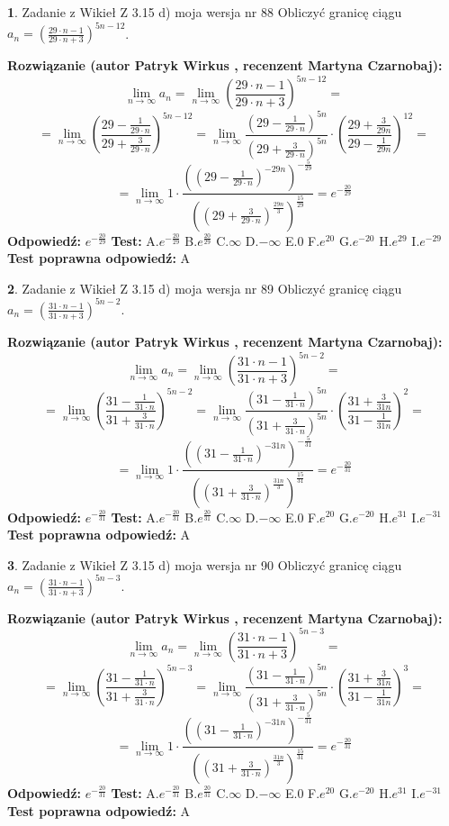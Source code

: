 \documentclass[12pt, a4paper]{article}
\theoremstyle{definition} %
\newtheorem{zad}{}
\newcommand{\zadStart}[1]{\begin{zad}#1\newline}
\newcommand{\zadStop}{\end{zad}}
\newcommand{\rozwStart}[2]{\noindent \textbf{Rozwiązanie (autor #1 , recenzent #2): }\newline}
\newcommand{\rozwStop}{\newline}
\newcommand{\odpStart}{\noindent \textbf{Odpowiedź:}\newline}
\newcommand{\odpStop}{\newline}
\newcommand{\testStart}{\noindent \textbf{Test:}\newline}
\newcommand{\testStop}{\newline}
\newcommand{\kluczStart}{\noindent \textbf{Test poprawna odpowiedź:}\newline}
\newcommand{\kluczStop}{\newline}
\begin{document}
\zadStart{Zadanie z Wikieł Z 3.15 d) moja wersja nr 88}
Obliczyć granicę ciągu $a_{n}=(\frac{29\cdot n - 1}{29 \cdot n + 3})^{5n-12}$.
\zadStop
\rozwStart{Patryk Wirkus}{Martyna Czarnobaj}
$$\lim\limits_{n\to\infty} a_{n} = \lim\limits_{n\to\infty}(\frac{29\cdot n - 1}{29 \cdot n + 3})^{5n-12}=$$
$$=\lim\limits_{n\to\infty}(\frac{29 - \frac{1}{29\cdot n}}{29 + \frac{3}{29 \cdot n}})^{5n-12}=\lim\limits_{n\to\infty}\frac{(29 - \frac{1}{29\cdot n})^{5n}}{(29 + \frac{3}{29\cdot n})^{5n}} \cdot (\frac{29+\frac{3}{29n}}{29-\frac{1}{29n}})^{12}=$$
$$=\lim\limits_{n\to\infty} 1 \cdot \frac{((29-\frac{1}{29 \cdot n})^{-29n})^{-\frac{5}{29}}}{((29+\frac{3}{29 \cdot n})^{\frac{29n}{3}})^{\frac{15}{29}}} =e^{-\frac{20}{29}}$$
\rozwStop
\odpStart
$e^{-\frac{20}{29}}$
\odpStop
\testStart
A.$ e^{-\frac{20}{29}}$
B.$ e^{\frac{20}{29}}$
C.$\infty$
D.$-\infty$
E.$0$
F.$e^{20}$
G.$e^{-20}$
H.$e^{29}$
I.$e^{-29}$
\testStop
\kluczStart
A
\kluczStop



\zadStart{Zadanie z Wikieł Z 3.15 d) moja wersja nr 89}
Obliczyć granicę ciągu $a_{n}=(\frac{31\cdot n - 1}{31 \cdot n + 3})^{5n-2}$.
\zadStop
\rozwStart{Patryk Wirkus}{Martyna Czarnobaj}
$$\lim\limits_{n\to\infty} a_{n} = \lim\limits_{n\to\infty}(\frac{31\cdot n - 1}{31 \cdot n + 3})^{5n-2}=$$
$$=\lim\limits_{n\to\infty}(\frac{31 - \frac{1}{31\cdot n}}{31 + \frac{3}{31 \cdot n}})^{5n-2}=\lim\limits_{n\to\infty}\frac{(31 - \frac{1}{31\cdot n})^{5n}}{(31 + \frac{3}{31\cdot n})^{5n}} \cdot (\frac{31+\frac{3}{31n}}{31-\frac{1}{31n}})^{2}=$$
$$=\lim\limits_{n\to\infty} 1 \cdot \frac{((31-\frac{1}{31 \cdot n})^{-31n})^{-\frac{5}{31}}}{((31+\frac{3}{31 \cdot n})^{\frac{31n}{3}})^{\frac{15}{31}}} =e^{-\frac{20}{31}}$$
\rozwStop
\odpStart
$e^{-\frac{20}{31}}$
\odpStop
\testStart
A.$ e^{-\frac{20}{31}}$
B.$ e^{\frac{20}{31}}$
C.$\infty$
D.$-\infty$
E.$0$
F.$e^{20}$
G.$e^{-20}$
H.$e^{31}$
I.$e^{-31}$
\testStop
\kluczStart
A
\kluczStop



\zadStart{Zadanie z Wikieł Z 3.15 d) moja wersja nr 90}
Obliczyć granicę ciągu $a_{n}=(\frac{31\cdot n - 1}{31 \cdot n + 3})^{5n-3}$.
\zadStop
\rozwStart{Patryk Wirkus}{Martyna Czarnobaj}
$$\lim\limits_{n\to\infty} a_{n} = \lim\limits_{n\to\infty}(\frac{31\cdot n - 1}{31 \cdot n + 3})^{5n-3}=$$
$$=\lim\limits_{n\to\infty}(\frac{31 - \frac{1}{31\cdot n}}{31 + \frac{3}{31 \cdot n}})^{5n-3}=\lim\limits_{n\to\infty}\frac{(31 - \frac{1}{31\cdot n})^{5n}}{(31 + \frac{3}{31\cdot n})^{5n}} \cdot (\frac{31+\frac{3}{31n}}{31-\frac{1}{31n}})^{3}=$$
$$=\lim\limits_{n\to\infty} 1 \cdot \frac{((31-\frac{1}{31 \cdot n})^{-31n})^{-\frac{5}{31}}}{((31+\frac{3}{31 \cdot n})^{\frac{31n}{3}})^{\frac{15}{31}}} =e^{-\frac{20}{31}}$$
\rozwStop
\odpStart
$e^{-\frac{20}{31}}$
\odpStop
\testStart
A.$ e^{-\frac{20}{31}}$
B.$ e^{\frac{20}{31}}$
C.$\infty$
D.$-\infty$
E.$0$
F.$e^{20}$
G.$e^{-20}$
H.$e^{31}$
I.$e^{-31}$
\testStop
\kluczStart
A
\kluczStop
\end{document}
